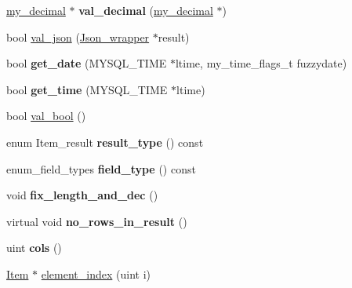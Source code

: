 \begin{DoxyCompactItemize}
\mbox{\hyperlink{classmy__decimal}{my\+\_\+decimal}} $\ast$ {\bfseries val\+\_\+decimal} (\mbox{\hyperlink{classmy__decimal}{my\+\_\+decimal}} $\ast$)
\item 
bool \mbox{\hyperlink{classItem__singlerow__subselect_a0f7547c32eca8cc13e5670aca3fd5e86}{val\+\_\+json}} (\mbox{\hyperlink{classJson__wrapper}{Json\+\_\+wrapper}} $\ast$result)
\item 
\mbox{\label{classItem__singlerow__subselect_a4e0dae26a1cbd5ce8980f27e88644f0a}} 
bool {\bfseries get\+\_\+date} (M\+Y\+S\+Q\+L\+\_\+\+T\+I\+ME $\ast$ltime, my\+\_\+time\+\_\+flags\+\_\+t fuzzydate)
\item 
\mbox{\label{classItem__singlerow__subselect_a5140153fa1582d68575eb54c554495cc}} 
bool {\bfseries get\+\_\+time} (M\+Y\+S\+Q\+L\+\_\+\+T\+I\+ME $\ast$ltime)
\item 
bool \mbox{\hyperlink{classItem__singlerow__subselect_a9e8de5972977f88a0354b36a05862a68}{val\+\_\+bool}} ()
\item 
\mbox{\label{classItem__singlerow__subselect_a12af2bb8d2dfb2827a5a82436391dc2e}} 
enum Item\+\_\+result {\bfseries result\+\_\+type} () const
\item 
\mbox{\label{classItem__singlerow__subselect_a7d77794265d358f2e7f75d41be7dd9c4}} 
enum\+\_\+field\+\_\+types {\bfseries field\+\_\+type} () const
\item 
\mbox{\label{classItem__singlerow__subselect_abe64300adfcc1e8db8559a92ac4719c5}} 
void {\bfseries fix\+\_\+length\+\_\+and\+\_\+dec} ()
\item 
\mbox{\label{classItem__singlerow__subselect_abc18755a002f179859d3a665c98e8b38}} 
virtual void {\bfseries no\+\_\+rows\+\_\+in\+\_\+result} ()
\item 
\mbox{\label{classItem__singlerow__subselect_a78602869d7d87a1bf5365aa392f51f17}} 
uint {\bfseries cols} ()
\item 
\mbox{\hyperlink{classItem}{Item}} $\ast$ \mbox{\hyperlink{classItem__singlerow__subselect_a3ff3e0ac48f187f1a53b54fd0e533b40}{element\+\_\+index}} (uint i)

\end{DoxyCompactItemize}
